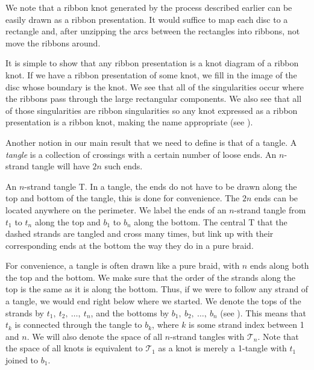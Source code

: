 \begin{paper}
We note that a ribbon knot generated by the process described earlier can be
easily drawn as a ribbon presentation.
It would suffice to map each disc to a rectangle and, after unzipping the arcs
between the rectangles into ribbons, not move the ribbons around.

It is simple to show that any ribbon presentation is a knot diagram of a ribbon
knot.
If we have a ribbon presentation of some knot, we fill in the image of the disc
whose boundary is the knot.
We see that all of the singularities occur where the ribbons pass through the
large rectangular components.
We also see that all of those singularities are ribbon singularities so any
knot expressed as a ribbon presentation is a ribbon knot, making the name
appropriate (see \figSingularities).


Another notion in our main result that we need to define is that of a tangle.
A \textit{tangle} is a collection of crossings with a certain number of loose
ends.
An $n$-strand tangle will have $2n$ such ends.

{An $n$-strand tangle T.
In a tangle, the ends do not have to be drawn along the top and bottom of the
tangle, this is done for convenience.
The $2n$ ends can be located anywhere on the perimeter.
We label the ends of an $n$-strand tangle from $t_1$ to $t_n$ along the top and
$b_1$ to $b_n$ along the bottom.
The central T that the dashed strands are tangled and cross many times, but link
up with their corresponding ends at the bottom the way they do in a pure braid.}

For convenience, a tangle is often drawn like a pure braid, with $n$ ends along
both the top and the bottom.
We make sure that the order of the strands along the top is the same as it is
along the bottom.
Thus, if we were to follow any strand of a tangle, we would end right below
where we started.
We denote the tops of the strands by $t_1,~t_2,~\dots,~t_n$, and the
bottoms  by $b_1,~b_2,~\dots,~b_n$ (see \figTangle).
This means that $t_k$ is connected through the tangle to $b_k$, where $k$ is
some strand index between 1 and $n$.
We will also denote the space of all $n$-strand tangles with $\mathcal{T}_n$.
Note that the space of all knots is equivalent to $\mathcal{T}_1$ as a knot is
merely a 1-tangle with $t_1$ joined to $b_1$.


\end{paper}

